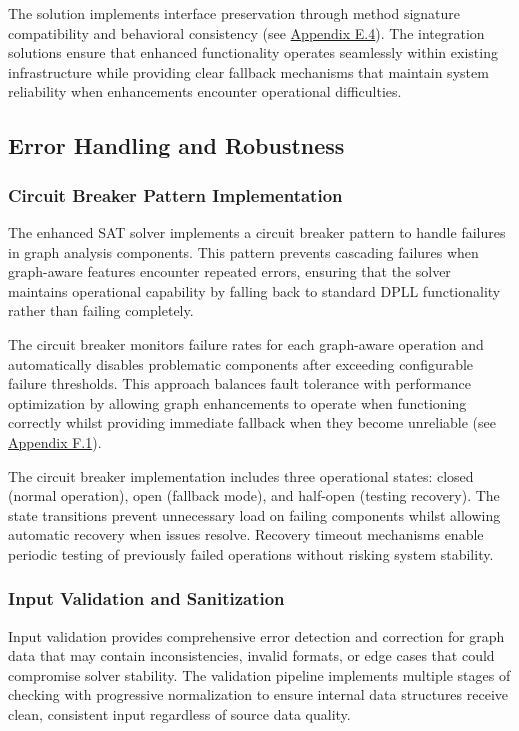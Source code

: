 The solution implements interface preservation through method signature compatibility and behavioral consistency (see \hyperref[appendix:interface-compatibility]{Appendix E.4}). The integration solutions ensure that enhanced functionality operates seamlessly within existing infrastructure while providing clear fallback mechanisms that maintain system reliability when enhancements encounter operational difficulties.

\subsection{Error Handling and Robustness}

\subsubsection{Circuit Breaker Pattern Implementation}

The enhanced SAT solver implements a circuit breaker pattern to handle failures in graph analysis components. This pattern prevents cascading failures when graph-aware features encounter repeated errors, ensuring that the solver maintains operational capability by falling back to standard DPLL functionality rather than failing completely.

The circuit breaker monitors failure rates for each graph-aware operation and automatically disables problematic components after exceeding configurable failure thresholds. This approach balances fault tolerance with performance optimization by allowing graph enhancements to operate when functioning correctly whilst providing immediate fallback when they become unreliable (see \hyperref[appendix:circuit-breaker]{Appendix F.1}).

The circuit breaker implementation includes three operational states: closed (normal operation), open (fallback mode), and half-open (testing recovery). The state transitions prevent unnecessary load on failing components whilst allowing automatic recovery when issues resolve. Recovery timeout mechanisms enable periodic testing of previously failed operations without risking system stability.

\subsubsection{Input Validation and Sanitization}

Input validation provides comprehensive error detection and correction for graph data that may contain inconsistencies, invalid formats, or edge cases that could compromise solver stability. The validation pipeline implements multiple stages of checking with progressive normalization to ensure internal data structures receive clean, consistent input regardless of source data quality.


